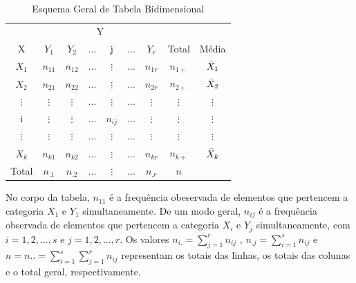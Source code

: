 \begin{table}[!htb]
    \centering
    {
    \caption{Esquema Geral de Tabela Bidimensional}
    \label{Bidimensional}
    \vspace{0.2cm}
\begin{tabular}{c|c|c|c|c|c|c|c|c}
  \hline\hline
                  &  \multicolumn{6}{c}{Y} \\
  \cline{2-7}
  X               & $Y_{1}$     & $Y_{2}$     & $\ldots$  & j        & $\ldots$  & $Y_{r}$  & Total    &  Média \\
  \hline
  $X_{1}$         & $ n_{11}$   & $ n_{12}$   & $\ldots$  & $\vdots$ & $\ldots$  & $n_{1r}$ & $n_{1+}$ & $\Bar{X}_{1}$\\
  $X_{2}$         & $ n_{21}$   & $ n_{22}$   & $\ldots$  & $\vdots$ & $\ldots$  & $n_{2r}$ & $n_{2+}$ & $\Bar{X}_{2}$\\
  $\vdots$        & $\vdots$    & $\vdots$    & $\ldots$  & $\vdots$ & $\ldots$  & $\vdots$ & $\vdots$ & $\vdots$\\
  i               & $\vdots$    & $\vdots$    & $\ldots$  & $n_{ij}$ & $\ldots$  & $\vdots$ & $\vdots$ & $\vdots$  \\
  $\vdots$        & $\vdots$    & $\vdots$    & $\ldots$  & $\vdots$ & $\ldots$  & $\vdots$ & $\vdots$ &  $\vdots$\\
  $X_{k}$         & $ n_{k1}$   & $ n_{k2}$   & $\ldots$  & $\vdots$ & $\ldots$  & $n_{kr}$ & $n_{k+}$ & $\Bar{X}_{k}$ \\
  \hline\hline
  Total              & $n_{.1}$    & $n_{.2}$    & $\ldots$  & $\vdots$ & $\ldots$  & $n_{.r}$ & $n$      & \\
   \hline\hline
\end{tabular}}
\end{table}


No corpo da tabela, $n_{11}$ é a frequência obeservada de
elementos que pertencem a categoria $X_{1}$ e $Y_{1}$
 simultaneamente. De um modo geral, $n_{ij}$ é a frequência observada de elementos que pertencem a categoria
 $X_{i}$ e $Y_{j}$ simultaneamente, com $i=1,2, \ldots,s $ e $j=1,2, \ldots ,r $. Os valores
 $n_{i.}=\sum_{j=1}^{r}n_{ij}$ , $n_{.j}=\sum_{i=1}^{s}n_{ij}$ e $n=n..=\sum_{i=1}^{s}\sum_{j=1}^{r}n_{ij}$
representam os totais das linhas, os totais das colunas e o total
geral, respectivamente.















